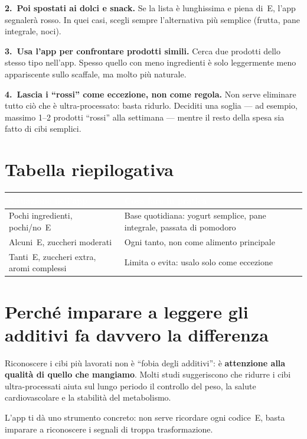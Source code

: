 \documentclass[a5paper,12pt,oneside,openany]{book}
\begin{document}
\textbf{2.~Poi spostati ai dolci e snack.} Se la lista è lunghissima e
piena di~E, l'app segnalerà rosso. In quei casi, scegli sempre
l'alternativa più semplice (frutta, pane integrale, noci).

\textbf{3.~Usa l'app per confrontare prodotti simili.} Cerca due prodotti
dello stesso tipo nell'app. Spesso quello con meno ingredienti è solo
leggermente meno appariscente sullo scaffale, ma molto più naturale.

\textbf{4.~Lascia i ``rossi'' come eccezione, non come regola.} Non serve
eliminare tutto ciò che è ultra-processato: basta ridurlo. Deciditi una
soglia --- ad esempio, massimo 1--2 prodotti ``rossi'' alla settimana ---
mentre il resto della spesa sia fatto di cibi semplici.

\section{Tabella riepilogativa}

{\small
\begin{tabularx}{\textwidth}{|L|L|}
\hline
{}\textcolor{white}{\textbf{Situazione nell'app}}
  & \textcolor{white}{\textbf{Cosa fare in pratica}} \\
\hline
Pochi ingredienti, pochi/no~E
  & Base quotidiana: yogurt semplice, pane integrale, passata di pomodoro \\
\hline
Alcuni~E, zuccheri moderati
  & Ogni tanto, non come alimento principale \\
\hline
Tanti~E, zuccheri extra, aromi complessi
  & Limita o evita: usalo solo come eccezione \\
\hline
\end{tabularx}
}

\section{Perché imparare a leggere gli additivi fa davvero la differenza}

Riconoscere i cibi più lavorati non è ``fobia degli additivi'': è
\textbf{attenzione alla qualità di quello che mangiamo}. Molti studi
suggeriscono che ridurre i cibi ultra-processati aiuta sul lungo periodo
il controllo del peso, la salute cardiovascolare e la stabilità del
metabolismo.

L'app ti dà uno strumento concreto: non serve ricordare ogni codice~E,
basta imparare a riconoscere i segnali di troppa trasformazione.

\end{document}
